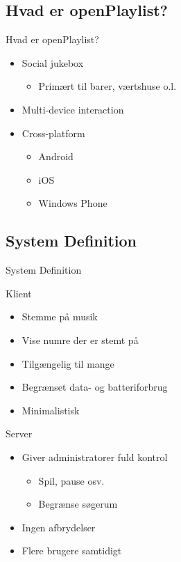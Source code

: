 \subsection{Hvad er openPlaylist?}
\begin{frame}{Hvad er openPlaylist?}
	\begin{itemize}
		\item Social jukebox
		\begin{itemize}
			\item Primært til barer, værtshuse o.l.
		\end{itemize}
		\item Multi-device interaction
		\item Cross-platform
		\begin{itemize}
			\item Android
			\item iOS
			\item Windows Phone
		\end{itemize}
	\end{itemize}
\end{frame}

\subsection{System Definition}
\begin{frame}{System Definition}
	\begin{multicols}{2}
		Klient
		\begin{itemize}
			\item Stemme på musik
			\item Vise numre der er stemt på
			\item Tilgængelig til mange
			\item Begrænset data- og batteriforbrug
			\item Minimalistisk
		\end{itemize}
		
		\columnbreak
		
		Server
		\begin{itemize}
			\item Giver administratorer fuld kontrol
			\begin{itemize}
				\item Spil, pause osv.
				\item Begrænse søgerum
			\end{itemize}
			\item Ingen afbrydelser
			\item Flere brugere samtidigt
		\end{itemize}
	\end{multicols}
\end{frame}
